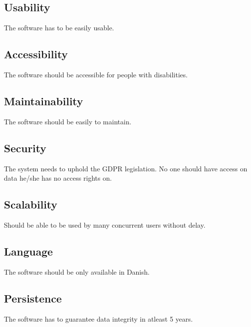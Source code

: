 \documentclass{article}
\begin{document}
\subsection{Usability}
The software has to be easily usable.

\subsection{Accessibility}
The software should be accessible for people with disabilities. 

\subsection{Maintainability}
The software should be easily to maintain.

\subsection{Security}
The system needs to uphold the GDPR legislation.
No one should have access on data he/she has no access rights on.

\subsection{Scalability}
Should be able to be used by many concurrent users without delay.

\subsection{Language}
The software should be only available in Danish.

\subsection{Persistence}
The software has to guarantee data integrity in atleast 5 years.

\newpage
\end{document}
